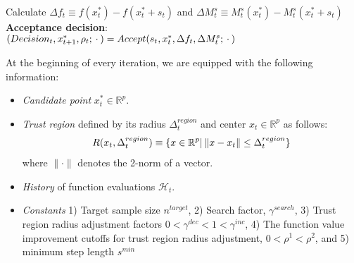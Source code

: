 \begin{algorithm}[H]
{        
         Calculate $\Delta f_t\equiv f(x_t^*) - f(x_t^*+s_t)$ and $\Delta M^{s}_t\equiv M_t^s(x_t^*) - M_t^s(x_t^*+s_t)$\\
         \nonl \textbf{Acceptance decision}:\\
         $(Decision_t,x_{t+1}^*,\rho_t;\hspace{0.2em}\cdot\hspace{0.2em}) =  Accept(s_t,x_t^{*},\Delta f_t,\Delta M_t^s;\hspace{0.2em}\cdot\hspace{0.2em})$\\
    }

    \end{algorithm}
\newpage
\restoregeometry

At the beginning of every iteration, we are equipped with the following information:
\begin{itemize}
    \item\textit{Candidate point} $x_t^*\in\mathbb{R}^p$.

\item \textit{Trust region} defined by its radius $\Delta_t^{region}$ and center $x_t\in\mathbb{R}^p$ as follows:
\begin{align}
    R(x_t,\Delta_t^{region})\equiv\{x\in\mathbb{R}^p|\hspace{0.2em}\lVert x-x_t\rVert\leq\Delta_t^{region}\}
    \label{eq:def-trustregion}
\end{align}
where $\lVert\cdot\rVert$ denotes the 2-norm of a vector.

\item \textit{History} of function evaluations $\mathcal{H}_t$.

\item \textit{Constants} 1) Target sample size $n^{target}$, 2) Search factor, $\gamma^{search}$, 3) Trust region radius adjustment factors $0<\gamma^{dec}<1<\gamma^{inc}$, 4) The function value improvement cutoffs for trust region radius adjustment, $0<\rho^1<\rho^2$, and 5) minimum step length $s^{min}$
\end{itemize}


